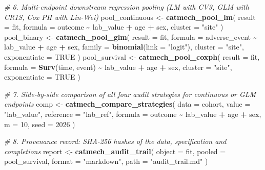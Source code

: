 \documentclass[
]{article}
\newenvironment{Shaded}{\begin{snugshade}}{\end{snugshade}}
\newcommand{\AttributeTok}[1]{\textcolor[rgb]{0.13,0.29,0.53}{#1}}
\newcommand{\CommentTok}[1]{\textcolor[rgb]{0.56,0.35,0.01}{\textit{#1}}}
\newcommand{\ConstantTok}[1]{\textcolor[rgb]{0.56,0.35,0.01}{#1}}
\newcommand{\DecValTok}[1]{\textcolor[rgb]{0.00,0.00,0.81}{#1}}
\newcommand{\FunctionTok}[1]{\textcolor[rgb]{0.13,0.29,0.53}{\textbf{#1}}}
\newcommand{\NormalTok}[1]{#1}
\newcommand{\OtherTok}[1]{\textcolor[rgb]{0.56,0.35,0.01}{#1}}
\newcommand{\SpecialCharTok}[1]{\textcolor[rgb]{0.81,0.36,0.00}{\textbf{#1}}}
\newcommand{\StringTok}[1]{\textcolor[rgb]{0.31,0.60,0.02}{#1}}
\begin{document}
\begin{Shaded}
\begin{Highlighting}[]
\CommentTok{\# 6. Multi{-}endpoint downstream regression pooling (LM with CV3, GLM with CR1S, Cox PH with Lin{-}Wei)}
\NormalTok{pool\_continuous }\OtherTok{\textless{}{-}} \FunctionTok{catmech\_pool\_lm}\NormalTok{(}
  \AttributeTok{result =}\NormalTok{ fit, }\AttributeTok{formula =}\NormalTok{ outcome }\SpecialCharTok{\textasciitilde{}}\NormalTok{ lab\_value }\SpecialCharTok{+}\NormalTok{ age }\SpecialCharTok{+}\NormalTok{ sex, }\AttributeTok{cluster =} \StringTok{"site"}
\NormalTok{)}
\NormalTok{pool\_binary }\OtherTok{\textless{}{-}} \FunctionTok{catmech\_pool\_glm}\NormalTok{(}
  \AttributeTok{result =}\NormalTok{ fit, }\AttributeTok{formula =}\NormalTok{ adverse\_event }\SpecialCharTok{\textasciitilde{}}\NormalTok{ lab\_value }\SpecialCharTok{+}\NormalTok{ age }\SpecialCharTok{+}\NormalTok{ sex,}
  \AttributeTok{family =} \FunctionTok{binomial}\NormalTok{(}\AttributeTok{link =} \StringTok{"logit"}\NormalTok{), }\AttributeTok{cluster =} \StringTok{"site"}\NormalTok{, }\AttributeTok{exponentiate =} \ConstantTok{TRUE}
\NormalTok{)}
\NormalTok{pool\_survival }\OtherTok{\textless{}{-}} \FunctionTok{catmech\_pool\_coxph}\NormalTok{(}
  \AttributeTok{result =}\NormalTok{ fit, }\AttributeTok{formula =} \FunctionTok{Surv}\NormalTok{(time, event) }\SpecialCharTok{\textasciitilde{}}\NormalTok{ lab\_value }\SpecialCharTok{+}\NormalTok{ age }\SpecialCharTok{+}\NormalTok{ sex,}
  \AttributeTok{cluster =} \StringTok{"site"}\NormalTok{, }\AttributeTok{exponentiate =} \ConstantTok{TRUE}
\NormalTok{)}

\CommentTok{\# 7. Side{-}by{-}side comparison of all four audit strategies for continuous or GLM endpoints}
\NormalTok{comp }\OtherTok{\textless{}{-}} \FunctionTok{catmech\_compare\_strategies}\NormalTok{(}
  \AttributeTok{data =}\NormalTok{ cohort, }\AttributeTok{value =} \StringTok{"lab\_value"}\NormalTok{, }\AttributeTok{reference =} \StringTok{"lab\_ref"}\NormalTok{,}
  \AttributeTok{formula =}\NormalTok{ outcome }\SpecialCharTok{\textasciitilde{}}\NormalTok{ lab\_value }\SpecialCharTok{+}\NormalTok{ age }\SpecialCharTok{+}\NormalTok{ sex, }\AttributeTok{m =} \DecValTok{10}\NormalTok{, }\AttributeTok{seed =} \DecValTok{2026}
\NormalTok{)}

\CommentTok{\# 8. Provenance record: SHA{-}256 hashes of the data, specification and completions}
\NormalTok{report }\OtherTok{\textless{}{-}} \FunctionTok{catmech\_audit\_trail}\NormalTok{(}
  \AttributeTok{object =}\NormalTok{ fit, }\AttributeTok{pooled =}\NormalTok{ pool\_survival, }\AttributeTok{format =} \StringTok{"markdown"}\NormalTok{, }\AttributeTok{path =} \StringTok{"audit\_trail.md"}
\NormalTok{)}
\end{Highlighting}
\end{Shaded}
\end{document}
